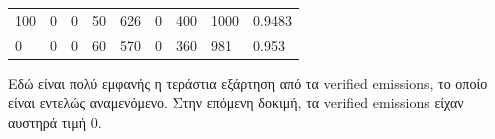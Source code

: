 \documentclass[a4paper,twoside,10pt]{article}
\begin{document}
\begin{table}[H]
\begin{tabular}{|llllllll|l|}
			100        & 0                                                          & 0         & 50                                                         & 626                                                     & 0                                                            & 400                                                               & 1000                                                          & 0.9483               \\
			0          & 0                                                          & 0         & 60                                                         & 570                                                     & 0                                                            & 360                                                               & 981                                                           & 0.953                \\ \hline
		\end{tabular}
	\end{table}
	
	Εδώ είναι πολύ εμφανής η τεράστια εξάρτηση από τα verified emissions, το οποίο είναι εντελώς αναμενόμενο. Στην επόμενη δοκιμή, τα verified emissions είχαν αυστηρά τιμή 0.
	
\end{document}
